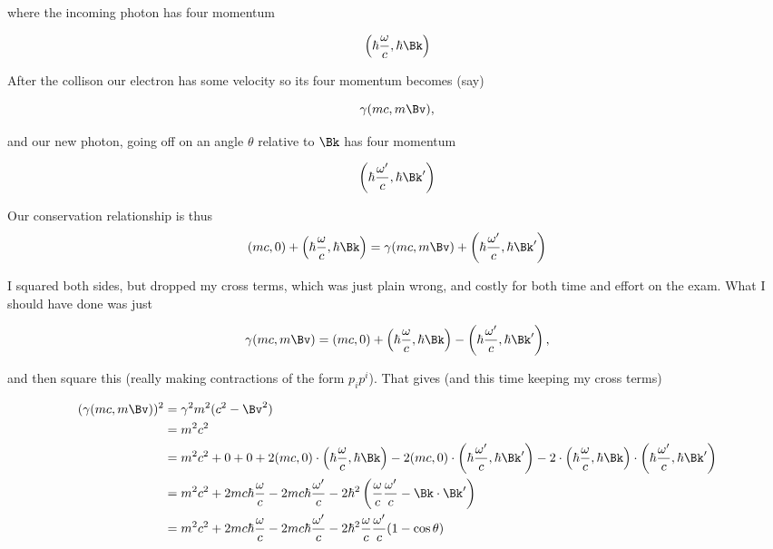 where the incoming photon has four momentum

\begin{equation}\label{eqn:relativisticElectrodynamicsExamReflection:n}
\left(\hbar \frac{\omega}{c}, \hbar \Bk \right)
\end{equation}

After the collison our electron has some velocity so its four momentum becomes (say)

\begin{equation}\label{eqn:relativisticElectrodynamicsExamReflection:n}
\gamma (m c, m \Bv),
\end{equation}

and our new photon, going off on an angle $\theta$ relative to $\Bk$ has four momentum

\begin{equation}\label{eqn:relativisticElectrodynamicsExamReflection:n}
\left(\hbar \frac{\omega'}{c}, \hbar \Bk' \right)
\end{equation}

Our conservation relationship is thus
\begin{equation}\label{eqn:relativisticElectrodynamicsExamReflection:n}
(m c, 0) + \left(\hbar \frac{\omega}{c}, \hbar \Bk \right)
=
\gamma (m c, m \Bv)
+
\left(\hbar \frac{\omega'}{c}, \hbar \Bk' \right)
\end{equation}

I squared both sides, but dropped my cross terms, which was just plain wrong, and costly for both time and effort on the exam.  What I should have done was just

\begin{equation}\label{eqn:relativisticElectrodynamicsExamReflection:n}
\gamma (m c, m \Bv) =
(m c, 0) + \left(\hbar \frac{\omega}{c}, \hbar \Bk \right)
-\left(\hbar \frac{\omega'}{c}, \hbar \Bk' \right),
\end{equation}

and then square this (really making contractions of the form $p_i p^i$).  That gives (and this time keeping my cross terms)

\begin{align*}
(\gamma (m c, m \Bv) )^2 
&= \gamma^2 m^2 (c^2 - \Bv^2) \\
&= m^2 c^2 \\
&=
m^2 c^2 + 0 + 0
+ 2 (m c, 0) 
\cdot \left(\hbar \frac{\omega}{c}, \hbar \Bk \right)
- 2 (m c, 0) \cdot \left(\hbar \frac{\omega'}{c}, \hbar \Bk' \right)
- 2 
\cdot \left(\hbar \frac{\omega}{c}, \hbar \Bk \right)
\cdot \left(\hbar \frac{\omega'}{c}, \hbar \Bk' \right) \\
&=
m^2 c^2 + 2 m c \hbar \frac{\omega}{c} - 2 m c \hbar \frac{\omega'}{c}
- 2\hbar^2 \left(
\frac{\omega}{c} \frac{\omega'}{c}
- 
\Bk \cdot \Bk'
\right) \\
&=
m^2 c^2 + 2 m c \hbar \frac{\omega}{c} - 2 m c \hbar \frac{\omega'}{c}
- 2\hbar^2 
\frac{\omega}{c} \frac{\omega'}{c} (1 - \cos\theta)
\end{align*}

